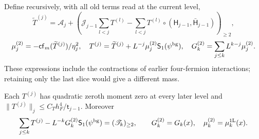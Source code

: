 \documentclass[11pt,letterpaper,reqno]{amsart}
\makeatletter
\theoremstyle{definition}
\newcommand{\ms@minorstart}{%
  \pushQED{\qed}\renewcommand{\qedsymbol}{$\blacksquare$}}
\newenvironment{proposition}[1][]{\ms@minorstart\ms@proposition[#1]}
  {\popQED\endms@proposition}
\theoremstyle{remark}
\makeatother
\begin{document}
Define recursively, with all old terms read at the current
level,
\[
 \widetilde T^{(j)}=\mathscr A_j+
 \left(\mathcal J_{j-1}\sum_{l<j}T^{(l)}
       -\sum_{l<j}T^{(l)}\circ(\mathsf H_{j-1},
                                     \bar{\mathsf H}_{j-1})\right)_{\ge2},
\]
\[
 \mu_j^{(2)}=-\mathsf{cf}_m(\widetilde T^{(j)})/\eta_j^2,
 \quad T^{(j)}=\widetilde T^{(j)}+
                 L^{-j}\mu_j^{(2)}\mathsf S_1(\psi^{\rm bg}),
 \quad G_k^{(2)}=\sum_{j\le k}L^{k-j}\mu_j^{(2)}.
\]
These expressions include the contractions of earlier
four-fermion interactions; retaining only the last slice
would give a different mass.

\begin{proposition}[The sum rule]\label{C-398-24}
Each $T^{(j)}$ has quadratic zeroth moment zero at every
later level and
$\|T^{(j)}\|_j\le C_Th_F^4/\mathsf t_{j-1}$.  Moreover
\[
 \sum_{j\le k}T^{(j)}-L^{-k}G_k^{(2)}
                       \mathsf S_1(\psi^{\rm bg})
                   =(\mathscr T_k)_{\ge2},
 \qquad G_k^{(2)}=G_k(x),\quad
                  \mu_k^{(2)}=\mu_k^{\rm1L}(x).
\]
\end{proposition}
\end{document}
